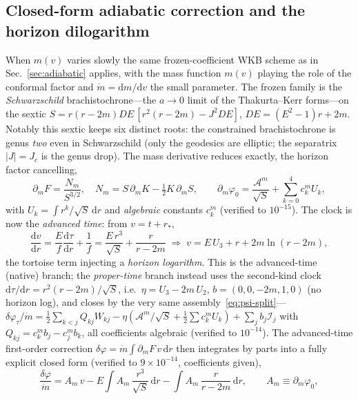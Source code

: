 \documentclass[12pt]{iopart}
\newcommand{\Jc}{J_{c}}
\newcommand{\dd}{\mathrm{d}}
\begin{document}
\subsection{Closed-form adiabatic correction and the horizon dilogarithm}
\label{sec:vaidya-adiabatic}
When $m(v)$ varies slowly the same frozen-coefficient WKB scheme as in
Sec.~\ref{sec:adiabatic} applies, with the mass function $m(v)$ playing the role of
the conformal factor and $\dot m=\dd m/\dd v$ the small parameter. The frozen family
is the \emph{Schwarzschild} brachistochrone---the $a\to0$ limit of the
Thakurta--Kerr forms---on the sextic
$S=r(r-2m)DE\,[r^2(r-2m)-J^2 DE]$, $DE=(E^2-1)r+2m$. Notably this sextic keeps six
distinct roots: the constrained brachistochrone is genus \emph{two} even in
Schwarzschild (only the geodesics are elliptic; the separatrix $|J|=\Jc$ is the
genus drop). The mass derivative reduces exactly, the horizon factor cancelling,
\begin{equation}
    \partial_m F=\frac{N_m}{S^{3/2}},\quad N_m=S\,\partial_m K-\tfrac12 K\,\partial_m S,
    \qquad
    \partial_m\varphi_0=\frac{\mathcal{A}^m}{\sqrt S}+\sum_{k=0}^4 c_k^m U_k,
    \label{eq:dm-reduction}
\end{equation}
with $U_k=\int r^k/\sqrt S\,\dd r$ and \emph{algebraic} constants $c_k^m$ (verified
to $10^{-15}$). The clock is now the \emph{advanced time}: from $v=t+r_*$,
\begin{equation}
    \frac{\dd v}{\dd r}=\frac{E}{f}\frac{\dd\tau}{\dd r}+\frac1f
    =\frac{E\,r^3}{\sqrt S}+\frac{r}{r-2m}
    \;\Rightarrow\;
    v=E\,U_3+r+2m\ln(r-2m),
    \label{eq:vaidya-clock}
\end{equation}
the tortoise term injecting a \emph{horizon logarithm}. This is the advanced-time
(native) branch; the \emph{proper-time} branch instead uses the second-kind clock
$\dd\tau/\dd r=r^2(r-2m)/\sqrt S$, i.e.\ $\eta=U_3-2m\,U_2$, $b=(0,0,-2m,1,0)$ (no
horizon log), and closes by the very same
assembly~\eqref{eq:psi-split}---$\delta\varphi_\tau/\dot m=\tfrac12\sum_{k<j}Q_{kj}
W_{kj}-\eta(\mathcal{A}^m/\sqrt S+\tfrac12\sum c_k^m U_k)+\sum_j b_j\mathcal{I}_j$ with
$Q_{kj}=c_k^m b_j-c_j^m b_k$, all coefficients algebraic (verified to
$10^{-14}$). The advanced-time first-order correction
$\delta\varphi=\dot m\!\int\!\partial_m F\,v\,\dd r$ then integrates by parts into a
fully explicit closed form (verified to $9\times10^{-14}$, coefficients given),
\begin{equation}
    \frac{\delta\varphi}{\dot m}
    =A_m\,v-E\!\int\! A_m\,\frac{r^3}{\sqrt S}\,\dd r
    -\int\! A_m\,\frac{r}{r-2m}\,\dd r,\qquad A_m\equiv\partial_m\varphi_0,
    \label{eq:vaidya-deltaphi}
\end{equation}
\end{document}
